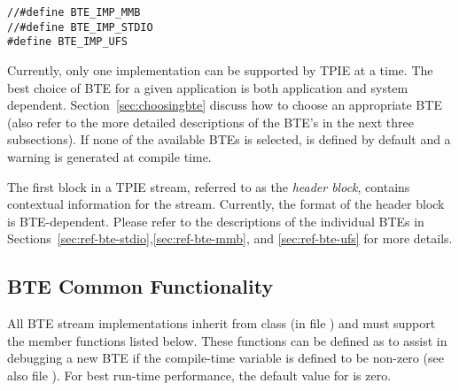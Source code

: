 \begin{verbatim}
//#define BTE_IMP_MMB
//#define BTE_IMP_STDIO
#define BTE_IMP_UFS
\end{verbatim}

Currently, only one implementation can be supported by TPIE
at a time.
 The best choice of BTE for a
given application is both application and system dependent.
Section~\ref{sec:choosingbte} discuss how to choose an
appropriate BTE (also refer to the more detailed
descriptions of the BTE's in the next three subsections). If
none of the available BTEs is selected,
 is defined by default and a warning
is generated at compile time.


The first block in a TPIE stream, referred to as the
\emph{header block}, contains
contextual information for the stream. Currently, the format
of the header block is BTE-dependent. Please refer to the
descriptions of the individual BTEs in
Sections~\ref{sec:ref-bte-stdio},\ref{sec:ref-bte-mmb}, and
\ref{sec:ref-bte-ufs} for more details.

\subsection{BTE Common Functionality}

All BTE stream implementations inherit from class
 (in file
) and must support the member
functions listed below. These functions can be defined as
 to assist in debugging a new BTE if the
compile-time variable  is defined
to be non-zero (see also file ). For
best run-time performance, the default value for
 is zero. 


